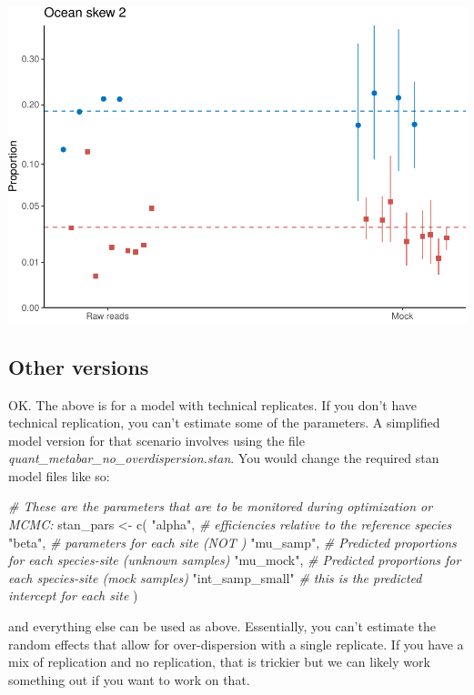 \documentclass[
]{article}
\newenvironment{Shaded}{\begin{snugshade}}{\end{snugshade}}
\newcommand{\CommentTok}[1]{\textcolor[rgb]{0.56,0.35,0.01}{\textit{#1}}}
\newcommand{\FunctionTok}[1]{\textcolor[rgb]{0.00,0.00,0.00}{#1}}
\newcommand{\NormalTok}[1]{#1}
\newcommand{\OtherTok}[1]{\textcolor[rgb]{0.56,0.35,0.01}{#1}}
\newcommand{\StringTok}[1]{\textcolor[rgb]{0.31,0.60,0.02}{#1}}
\begin{document}
\includegraphics{Appendix_S4_files/figure-latex/stan_plotting_bayes-2.pdf}

\hypertarget{other-versions}{%
\subsection{Other versions}\label{other-versions}}

OK. The above is for a model with technical replicates. If you don't
have technical replication, you can't estimate some of the parameters. A
simplified model version for that scenario involves using the file
\emph{quant\_metabar\_no\_overdispersion.stan}. You would change the
required stan model files like so:

\begin{Shaded}
\begin{Highlighting}[]
\CommentTok{\# These are the parameters that are to be monitored during optimization or MCMC:}
\NormalTok{stan\_pars }\OtherTok{\textless{}{-}} \FunctionTok{c}\NormalTok{(}
  \StringTok{"alpha"}\NormalTok{, }\CommentTok{\# efficiencies relative to the reference species}
  \StringTok{"beta"}\NormalTok{,  }\CommentTok{\# parameters for each site (NOT )}
  \StringTok{"mu\_samp"}\NormalTok{, }\CommentTok{\# Predicted proportions for each species{-}site (unknown samples)}
  \StringTok{"mu\_mock"}\NormalTok{, }\CommentTok{\# Predicted proportions for each species{-}site (mock samples)}
  \StringTok{"int\_samp\_small"} \CommentTok{\# this is the predicted intercept for each site }
\NormalTok{)}
\end{Highlighting}
\end{Shaded}

and everything else can be used as above. Essentially, you can't
estimate the random effects that allow for over-dispersion with a single
replicate. If you have a mix of replication and no replication, that is
trickier but we can likely work something out if you want to work on
that.
\end{document}
